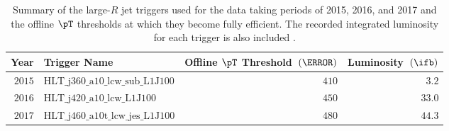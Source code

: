 \begin{table}[htpb]
 \centering 
  \caption{ Summary of the large-$R$ jet triggers used for the data taking
periods of 2015, 2016, and 2017 and the offline $\pT$ thresholds at which
they become fully efficient. The recorded integrated luminosity for each
trigger is also included \cite{Alison:2649017}.}
 \begin{tabular}{@{}rlrr@{}}
  \toprule
  Year   & Trigger Name                 & Offline $\pT$ Threshold~$(\GeV)$ & Luminosity~$\left(\ifb\right)$ \\ \midrule
  $2015$ & $\text{HLT\_j360\_a10\_lcw\_sub\_L1J100}$  & $410$                              & $3.2$                          \\
  $2016$ & $\text{HLT\_j420\_a10\_lcw\_L1J100}$      & $450$                              & $33.0$                         \\
  $2017$ & $\text{HLT\_j460\_a10t\_lcw\_jes\_L1J100}$ & $480$                              & $44.3$                         \\
  \bottomrule
 \end{tabular}
 \label{table:triggers}
\end{table}
